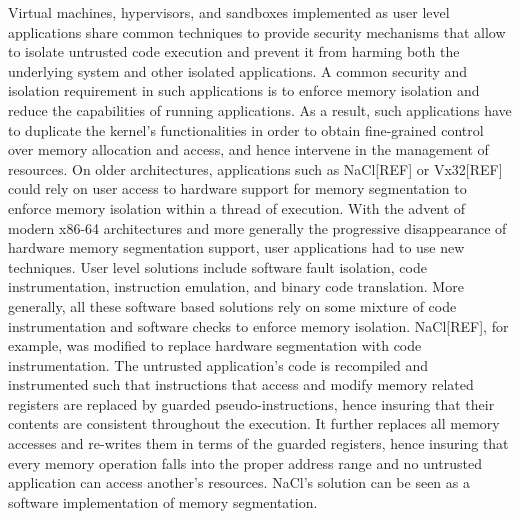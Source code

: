 \documentclass[letterpaper,twocolumn,10pt]{article}
\begin{document}
Virtual machines, hypervisors, and sandboxes implemented as user level applications share common techniques to provide security mechanisms that allow to isolate untrusted code execution and prevent it from harming both the underlying system and other isolated applications.
A common security and isolation requirement in such applications is to enforce memory isolation and reduce the capabilities of running applications.
As a result, such applications have to duplicate the kernel's functionalities in order to obtain fine-grained control over memory allocation and access, and hence intervene in the management of resources.
On older architectures, applications such as NaCl[REF] or Vx32[REF] could rely on user access to hardware support for memory segmentation to enforce memory isolation within a thread of execution.
With the advent of modern x86-64 architectures and more generally the progressive disappearance of hardware memory segmentation support, user applications had to use new techniques.
User level solutions include software fault isolation, code instrumentation, instruction emulation, and binary code translation.
More generally, all these software based solutions rely on some mixture of code instrumentation and software checks to enforce memory isolation.
NaCl[REF], for example, was modified to replace hardware segmentation with code instrumentation.
The untrusted application's code is recompiled and instrumented such that instructions that access and modify memory related registers are replaced by guarded pseudo-instructions, hence insuring that their contents are consistent throughout the execution.
It further replaces all memory accesses and re-writes them in terms of the guarded registers, hence insuring that every memory operation falls into the proper address range and no untrusted application can access another's resources.
NaCl's solution can be seen as a software implementation of memory segmentation.
\end{document}
